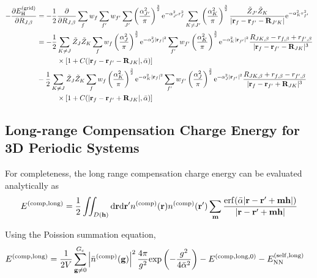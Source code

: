 \documentclass[paper=a4, fontsize=11pt]{article} %
\numberwithin{equation}{section} %
\numberwithin{figure}{section} %
\numberwithin{table}{section} %
\newcommand{\p}{\partial}
\newcommand{\bh}{{\bf{h}}}
\newcommand{\bm}{{\bf{m}}}
\newcommand{\bg}{{\bf{g}}}
\newcommand{\br}{{\bf{r}}}
\newcommand{\bR}{{\bf{R}}}
\newcommand{\rexp}{{\mathrm{exp}}}
\newcommand{\rNN}{{\mathrm{NN}}}
\newcommand{\rself}{{\mathrm{self}}}
\newcommand{\re}{{\mathrm{e}}}
\newcommand{\rlong}{{\mathrm{long}}}
\newcommand{\rerf}{{\mathrm{erf}}}
\newcommand{\rd}{{\mathrm{d}}}
\newcommand{\rH}{{\mathrm{H}}}
\newcommand{\rcomp}{{\mathrm{comp}}}
\newcommand{\rgrid}{{\mathrm{grid}}}
\newcommand{\al}{{\alpha}}
\newcommand{\RJb}{{R_{J,\beta}}}
\newcommand{\Gc}{{G_{\mathrm{c}}}}
\newcommand{\bal}{{\bar{\alpha}}}
\begin{document}
\begin{equation}
\begin{split}
-\frac{\p E_{\rH}^{(\rgrid)}}{\p \RJb} &= -\frac{1}{2}\frac{\p}{\p \RJb}\sum_f w_f \sum_{f'} w_{f'} \sum_{J'} \left(\frac{\al_{J'}^2}{\pi}\right)^{\frac{3}{2}} \re^{-\al_{J'}^2 r_f^2} \sum_{K \neq J'} \left(\frac{\al_K^2}{\pi}\right)^{\frac{3}{2}} \frac{\tilde Z_{J'}\tilde Z_K}{|\br_f-\br_{f'}-\bR_{J'K}|} \re^{-\al_K^2 r_{f'}^2}\\
&= -\frac{1}{2}\sum_{K \neq J} \tilde Z_J\tilde Z_{K} \sum_f w_f \left(\frac{\al_{J}^2}{\pi}\right)^{\frac{3}{2}} \re^{-\al_{J}^2|\br_f|^2}\sum_{f'} w_{f'} \left(\frac{\al_{K}^2}{\pi}\right)^{\frac{3}{2}} \re^{-\al_{K}^2|\br_{f'}|^2}\frac{R_{JK,\beta}-r_{f,\beta}+r_{f',\beta}}{|\br_f - \br_{f'} - \bR_{JK}|^3}\\
&\hspace{10mm} \times \left[1 + C( |\br_f - \br_{f'} - \bR_{JK}|,\bal)\right] \\
& -\frac{1}{2}\sum_{K \neq J} \tilde Z_J\tilde Z_{K} \sum_f w_f \left(\frac{\al_{K}^2}{\pi}\right)^{\frac{3}{2}} \re^{-\al_{K}^2|\br_f|^2}\sum_{f'} w_{f'} \left(\frac{\al_{J}^2}{\pi}\right)^{\frac{3}{2}} \re^{-\al_{J}^2|\br_{f'}|^2}\frac{R_{JK,\beta}+r_{f,\beta}-r_{f',\beta}}{|\br_f - \br_{f'} + \bR_{JK}|^3}\\
&\hspace{10mm} \times \left[1 + C( |\br_f - \br_{f'} + \bR_{JK}|,\bal)\right] \\
\end{split}
\end{equation}



\subsection{Long-range Compensation Charge Energy for 3D Periodic Systems}
For completeness, the long range compensation charge energy can be evaluated analytically as
\begin{equation}
\begin{split}
E^{(\rcomp,\rlong)} 
&= \frac{1}{2}\iint_{D(\bh)} \rd \br \rd \br' n^{(\rcomp)}(\br)n^{(\rcomp)}(\br')\sum_{\bm}\frac{\rerf(\bar {\al}|\br-\br'+\bm\bh|)}{|\br-\br'+\bm\bh|} \\
\end{split}
\end{equation}

Using the Poission summation equation,
\begin{equation}
\begin{split}
E^{(\rcomp,\rlong)}
&= \frac{1}{2V} \sum_{\bg \neq 0}^{\Gc} \left|\bar n ^{(\rcomp)}(\bg)\right|^2 \frac{4\pi}{g^2} \rexp\left(-\frac{g^2}{4\bal^2}\right) - E^{(\rcomp,\rlong,0)} - E_{\rNN}^{(\rself,\rlong)}
\end{split}
\end{equation}
\end{document}
